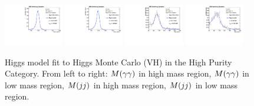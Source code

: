 \begin{figure}[h]
  \centering
\includegraphics[width=0.23\textwidth]{figures/sec-signals/HiggsShapes/vh_HM_signal_fit_mgg_cat0.pdf}
\includegraphics[width=0.23\textwidth]{figures/sec-signals/HiggsShapes/vh_LM_signal_fit_mgg_cat0.pdf}
\includegraphics[width=0.23\textwidth]{figures/sec-signals/HiggsShapes/vh_HM_signal_fit_mjj_cat0.pdf}
\includegraphics[width=0.23\textwidth]{figures/sec-signals/HiggsShapes/vh_LM_signal_fit_mjj_cat0.pdf}
  \caption{Higgs model fit to Higgs Monte Carlo (VH) in the High Purity Category. From left to right: $M(\gamma\gamma)$ in high mass region, $M(\gamma\gamma)$ in low mass region, $M(jj)$ in high mass region, $M(jj)$ in low mass region.}
  \label{fig:higgs_fit_vh}
\end{figure}

